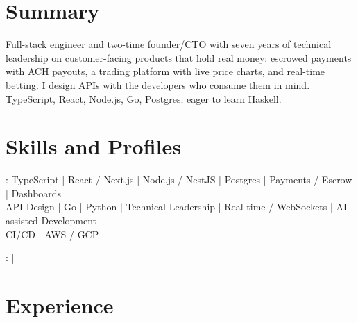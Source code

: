 \documentclass[print]{jack-resume}
\begin{document}
\pagecolor{darkmodeBackground}


\begin{minipage}[t][1cm][t]{.03\textwidth}
    \hfill
\end{minipage}

\section{Summary}
Full-stack engineer and two-time founder/CTO with seven years of technical leadership on customer-facing products that hold real money: escrowed payments with ACH payouts, a trading platform with live price charts, and real-time betting. I design APIs with the developers who consume them in mind. TypeScript, React, Node.js, Go, Postgres; eager to learn Haskell.
\sectionsep

\section{Skills and Profiles}
:
TypeScript \hfill | \hfill
React / Next.js \hfill | \hfill
Node.js / NestJS \hfill | \hfill
Postgres \hfill | \hfill
Payments / Escrow \hfill | \hfill
Dashboards \\
\hspace{1.0cm} API Design \hfill | \hfill
Go \hfill | \hfill
Python \hfill | \hfill
Technical Leadership \hfill | \hfill
Real-time / WebSockets \hfill | \hfill
AI-assisted Development \\
\hspace{1.0cm} CI/CD \hfill | \hfill
AWS / GCP \\

\raggedright{
    :
      \href{https://www.linkedin.com/in/jack-sturtevant/}{ \ExternalLink} |
     \href{https://github.com/jacksturt}{ \ExternalLink}}

\section{Experience}
\end{document}
